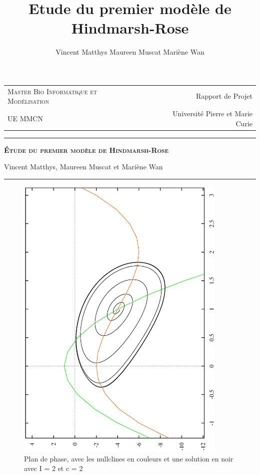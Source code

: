 \documentclass[12pt,a4paper,onecolumn]{article}
\title{Etude du premier modèle de Hindmarsh-Rose}
\author{Vincent Matthys Maureen Muscat Mariène Wan}
\begin{document}
\begin{tabularx}{\textwidth}{@{} l X r @{} }
{\textsc{Master Bio Informatique et Modélisation}} & & Rapport de Projet \\
UE MMCN & &{Université Pierre et Marie Curie}\\
\end{tabularx}
\vspace{1.5cm}
\begin{center}

\rule[11pt]{5cm}{0.5pt}

\textbf{\LARGE \textsc{\'Etude du premier modèle de Hindmarsh-Rose}}
\vspace{0.5cm}

Vincent Matthys, Maureen Muscat et Mariène Wan


\rule{5cm}{0.5pt}

\vspace{1.5cm}


\begin{figure}[ht]
\begin{center}
\includegraphics[angle=270, origin =c, width = 0.9\textwidth]{1.eps}
\end{center}
\caption{Plan de phase, avec les nullclines en couleurs et une solution en noir avec I = 2 et c = 2}
\end{figure}

\end{center}
\end{document}
